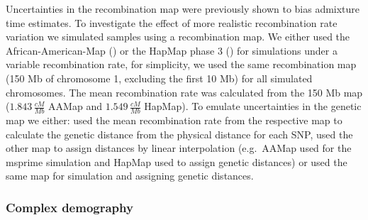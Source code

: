 \documentclass[]{article}
\begin{document}
Uncertainties in the recombination map were previously shown to bias
admixture time estimates. To investigate the effect of more realistic
recombination rate variation we simulated samples using a recombination map. We
either used the African-American-Map (\cite{hinch_landscape_2011}) or
the HapMap phase 3 (\cite{HapMapConsortium_second_2007}) for simulations
under a variable recombination rate, for simplicity, we used the same
recombination map (150 Mb of chromosome 1, excluding the first 10 Mb)
for all simulated chromosomes. The mean recombination rate was
calculated from the 150 Mb map (\(1.843 \, \frac{cM}{Mb}\) AAMap and
\(1.549 \, \frac{cM}{Mb}\) HapMap). To emulate uncertainties in the
genetic map we either: used the mean recombination rate from the
respective map to calculate the genetic distance from the physical
distance for each SNP, used the other map to assign distances by linear interpolation
(e.g.~AAMap used for the msprime simulation and HapMap used to assign
genetic distances) or used the same map for simulation and assigning
genetic distances.

\subsubsection{Complex demography}\label{inferred demography}
\end{document}
